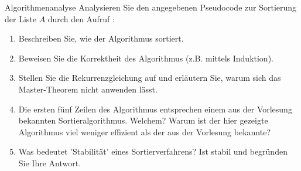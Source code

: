 \documentclass{article}
\begin{document}
\begin{exercise}{Algorithmenanalyse}
  Analysieren Sie den angegebenen Pseudocode  zur Sortierung der Liste $A$ durch den Aufruf :
  
  \begin{enumerate}
    \item Beschreiben Sie, wie der Algorithmus sortiert.
    \item Beweisen Sie die Korrektheit des Algorithmus (z.B. mittels Induktion).
    \item Stellen Sie die Rekurrenzgleichung auf und erläutern Sie, warum sich das Master-Theorem nicht anwenden lässt.
    \item Die ersten fünf Zeilen des Algorithmus entsprechen einem aus der Vorlesung bekannten Sortieralgorithmus. Welchem? Warum ist der hier gezeigte Algorithmus viel weniger effizient als der aus der Vorlesung bekannte?
    \item Was bedeutet 'Stabilität' eines Sortierverfahrens? Ist  stabil und begründen Sie Ihre Antwort.
  \end{enumerate}


\end{exercise}
\end{document}
